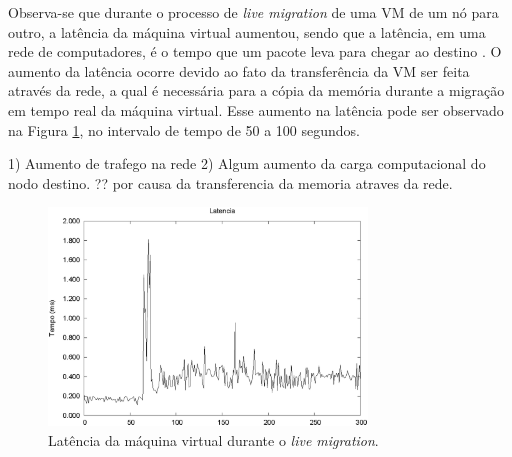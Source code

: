% 

Observa-se que durante o processo de \textit{live migration} de uma \ac{VM} de um nó para outro, a latência da máquina virtual aumentou, 
sendo que a latência, em uma rede de computadores, é o tempo que um pacote leva para chegar ao destino \cite{geordano2014}.
O aumento da latência ocorre devido ao fato da transferência da \ac{VM} ser feita através da rede, a qual é necessária para a cópia da memória 
durante a migração em tempo real da máquina virtual. 
Esse aumento na latência pode ser observado na Figura \ref{fig:teste2_latencia}, no intervalo de tempo de 50 a 100 segundos.

1) Aumento de trafego na rede
2) Algum aumento da carga computacional do nodo destino.
?? por causa da transferencia da memoria atraves da rede.


\begin{figure}[h!]
 \centering
 \includegraphics[width=320px]{img/teste2_latencia.eps}
 \caption{Latência da máquina virtual durante o \textit{live migration}.}
 \label{fig:teste2_latencia}
\end{figure}


